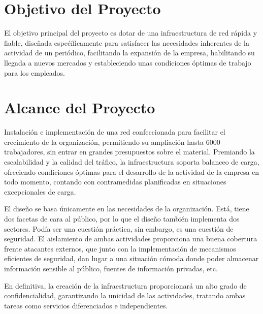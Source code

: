 \documentclass[a4paper,onecolumn,11pt]{article}
\begin{document}
\section{Objetivo del Proyecto}


El objetivo principal del proyecto es dotar de una infraestructura de red rápida y fiable, diseñada espećíficamente para satisfacer las necesidades inherentes de la actividad de un periódico, facilitando la expansión de la empresa, habilitando su llegada a nuevos mercados y estableciendo unas condiciones óptimas de trabajo para los empleados.

\section{Alcance del Proyecto}


Instalación e implementación de una red confeccionada para facilitar el crecimiento de la organización, permitiendo su ampliación hasta 6000 trabajadores, sin entrar en grandes presupuestos sobre el material. Premiando la escalabilidad y la calidad del tráfico, la infraestructura soporta balanceo de carga, ofreciendo condiciones óptimas para el desarrollo de la actividad de la empresa en todo momento, contando con contramedidas planificadas en situaciones excepcionales de carga.

El diseño se basa únicamente en las necesidades de la organización. Está, tiene dos facetas de cara al público, por lo que el diseño también implementa dos sectores. Podía ser una cuestión práctica, sin embargo, es una cuestión de seguridad. El aislamiento de ambas actividades proporciona una buena cobertura frente atacantes externos, que junto con la implementación de mecanismos eficientes de seguridad, dan lugar a una situación cómoda donde poder almacenar información sensible al público, fuentes de información privadas, etc.

En definitiva, la creación de la infraestructura proporcionará un alto grado de confidencialidad, garantizando la unicidad de las actividades, tratando ambas tareas como servicios diferenciados e 
independientes. 
\end{document}
